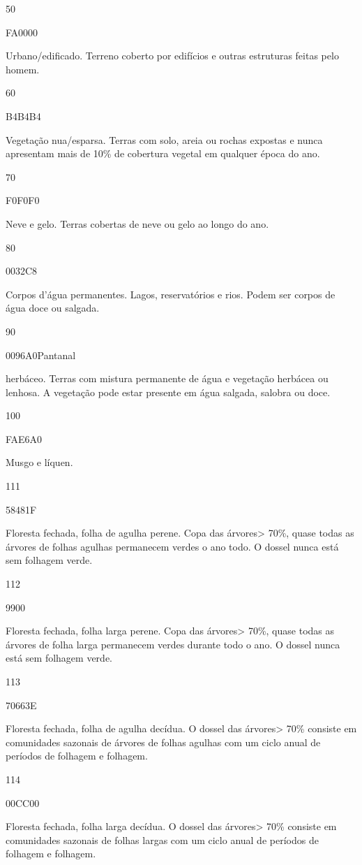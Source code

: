 \documentclass[
]{book}
\begin{document}
50

FA0000

Urbano/edificado. Terreno coberto por edifícios e outras estruturas feitas pelo homem.

60

B4B4B4

Vegetação nua/esparsa. Terras com solo, areia ou rochas expostas e nunca apresentam mais de 10\% de cobertura vegetal em qualquer época do ano.

70

F0F0F0

Neve e gelo. Terras cobertas de neve ou gelo ao longo do ano.

80

0032C8

Corpos d'água permanentes. Lagos, reservatórios e rios. Podem ser corpos de água doce ou salgada.

90

0096A0Pantanal

herbáceo. Terras com mistura permanente de água e vegetação herbácea ou lenhosa. A vegetação pode estar presente em água salgada, salobra ou doce.

100

FAE6A0

Musgo e líquen.

111

58481F

Floresta fechada, folha de agulha perene. Copa das árvores\textgreater{} 70\%, quase todas as árvores de folhas agulhas permanecem verdes o ano todo. O dossel nunca está sem folhagem verde.

112

9900

Floresta fechada, folha larga perene. Copa das árvores\textgreater{} 70\%, quase todas as árvores de folha larga permanecem verdes durante todo o ano. O dossel nunca está sem folhagem verde.

113

70663E

Floresta fechada, folha de agulha decídua. O dossel das árvores\textgreater{} 70\% consiste em comunidades sazonais de árvores de folhas agulhas com um ciclo anual de períodos de folhagem e folhagem.

114

00CC00

Floresta fechada, folha larga decídua. O dossel das árvores\textgreater{} 70\% consiste em comunidades sazonais de folhas largas com um ciclo anual de períodos de folhagem e folhagem.
\end{document}
